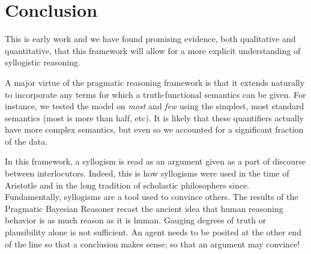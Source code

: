 \documentclass[10pt,letterpaper]{article}
\begin{document}
\section{Conclusion}

This is early work and we have found promising evidence, both qualitative and quantitative, that this framework will allow for a more explicit understanding of syllogistic reasoning. 


A major virtue of the pragmatic reasoning framework is that it extends naturally to incorporate any terms for which a truth-functional semantics can be given.
For instance, we tested the model on \emph{most} and \emph{few} using the simplest, most standard semantics (most is more than half, etc). It is likely that these quantifiers actually have more complex semantics, but even so we accounted for a significant fraction of the data.

In this framework, a syllogism is read as an argument given as a part of discourse between interlocutors. Indeed, this is how syllogisms were used in the time of Aristotle and in the long tradition of scholastic philosophers since. Fundamentally, syllogisms are a tool used to convince others. The results of the Pragmatic Bayesian Reasoner recast the ancient idea that human reasoning behavior is as much reason as it is human. Gauging degrees of truth or plausibility alone is not sufficient. An agent needs to be posited at the other end of the line so that a conclusion makes sense; so that an argument may convince!



\setlength{\bibleftmargin}{.125in}
\setlength{\bibindent}{-\bibleftmargin}


\end{document}
